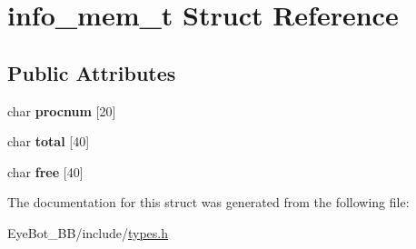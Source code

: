 \hypertarget{structinfo__mem__t}{\section{info\-\_\-mem\-\_\-t \-Struct \-Reference}
\label{structinfo__mem__t}
}
\subsection*{\-Public \-Attributes}
\begin{DoxyCompactItemize}
\item 
\hypertarget{structinfo__mem__t_a6209c79ce364dd2d73875182157da4c9}{char {\bfseries procnum} \mbox{[}20\mbox{]}}\label{structinfo__mem__t_a6209c79ce364dd2d73875182157da4c9}

\item 
\hypertarget{structinfo__mem__t_a1df7e4cf98efe5696d90a06282516cb1}{char {\bfseries total} \mbox{[}40\mbox{]}}\label{structinfo__mem__t_a1df7e4cf98efe5696d90a06282516cb1}

\item 
\hypertarget{structinfo__mem__t_a8a48731541f49e3d404180d675eecde1}{char {\bfseries free} \mbox{[}40\mbox{]}}\label{structinfo__mem__t_a8a48731541f49e3d404180d675eecde1}

\end{DoxyCompactItemize}


\-The documentation for this struct was generated from the following file\-:\begin{DoxyCompactItemize}
\item 
\-Eye\-Bot\-\_\-\-B\-B/include/\hyperlink{types_8h}{types.\-h}\end{DoxyCompactItemize}
